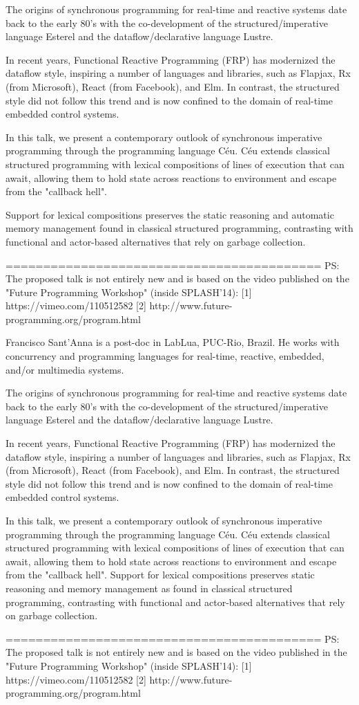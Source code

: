 The origins of synchronous programming for real-time and reactive systems date back to the early 80's with the co-development of the structured/imperative language Esterel and the dataflow/declarative language Lustre.

In recent years, Functional Reactive Programming (FRP) has modernized the dataflow style, inspiring a number of languages and libraries, such as Flapjax, Rx (from Microsoft), React (from Facebook), and Elm.
In contrast, the structured style did not follow this trend and is now confined to the domain of real-time embedded control systems.

In this talk, we present a contemporary outlook of synchronous imperative programming through the programming language Céu.
Céu extends classical structured programming with lexical compositions of lines of execution that can await, allowing them to hold state across reactions to environment and escape from the "callback hell".

Support for lexical compositions preserves the static reasoning and automatic memory management found in classical structured programming, contrasting with functional and actor-based alternatives that rely on garbage collection.

==========================================
PS:
The proposed talk is not entirely new and is based on the video published on 
the "Future Programming Workshop" (inside SPLASH'14):
[1] https://vimeo.com/110512582
[2] http://www.future-programming.org/program.html

Francisco Sant'Anna is a post-doc in LabLua, PUC-Rio, Brazil.
He works with concurrency and programming languages for real-time, reactive, 
embedded, and/or multimedia systems.

The origins of synchronous programming for real-time and reactive systems date back to the early 80's with the co-development of the structured/imperative language Esterel and the dataflow/declarative language Lustre.

In recent years, Functional Reactive Programming (FRP) has modernized the dataflow style, inspiring a number of languages and libraries, such as Flapjax, Rx (from Microsoft), React (from Facebook), and Elm.
In contrast, the structured style did not follow this trend and is now confined to the domain of real-time embedded control systems.

In this talk, we present a contemporary outlook of synchronous imperative programming through the programming language Céu.
Céu extends classical structured programming with lexical compositions of lines of execution that can await, allowing them to hold state across reactions to environment and escape from the "callback hell".
Support for lexical compositions preserves static reasoning and memory management as found in classical structured programming, contrasting with functional and actor-based alternatives that rely on garbage collection.

==========================================
PS:
The proposed talk is not entirely new and is based on the video published in the "Future Programming Workshop" (inside SPLASH'14):
[1] https://vimeo.com/110512582
[2] http://www.future-programming.org/program.html
